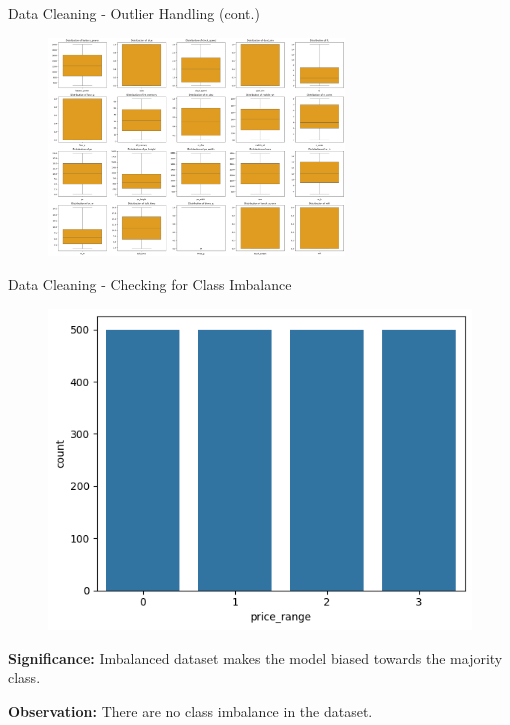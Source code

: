 \documentclass[14pt, aspectratio=169]{beamer}
\begin{document}
\begin{frame}[containsverbatim]{Data Cleaning - Outlier Handling (cont.)}
  \begin{figure}[H]
    \centering
    \includegraphics[width=0.7\textwidth]{../report/box_plots_after.png}
  \end{figure}
\end{frame}
\begin{frame}{Data Cleaning - Checking for Class Imbalance}
  \begin{figure}[H]
    \centering
    \includegraphics[height=0.3\textwidth]{../report/imbalance_check.png}
  \end{figure}
  \begin{minipage}{0.475\textwidth}
    \begin{block}{}
      \textbf{Significance:} \small
      Imbalanced dataset makes the model biased towards the majority class.
    \end{block}
  \end{minipage}
  \hfill
  \begin{minipage}{0.475\textwidth}
    \begin{block}{}
      \textbf{Observation:} \small
      There are no class imbalance in the dataset.
    \end{block}
  \end{minipage}
\end{frame}
\end{document}

